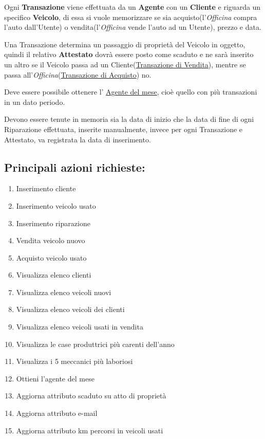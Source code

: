 \documentclass[a4paper,12pt]{report}
\begin{document}
Ogni \textbf{Transazione} viene effettuata da un \textbf{Agente} con un \textbf{Cliente} e riguarda un specifico \textbf{Veicolo},
%
di essa si vuole memorizzare se sia acquisto(l'\textit{Officina} compra l'auto dall'Utente) o vendita(l'\textit{Officina} 
% 
vende l'auto ad un Utente), prezzo e data. 

\noindent
Una Transazione determina un passaggio di proprietà del Veicolo in oggetto, quindi il relativo \textbf{Attestato} 
%
dovrà essere posto come scaduto e ne sarà inserito un altro se il Veicolo passa ad un Cliente(\underline{Transazione di Vendita}),
%
mentre se passa all'\textit{Officina}(\underline{Transazione di Acquisto}) no.

Deve essere possibile ottenere l' \underline{Agente del mese}, cioè quello con più transazioni in un dato periodo. 

Devono essere tenute in memoria sia la data di inizio che la data di fine di ogni Riparazione effettuata, inserite manualmente,
%
invece per ogni Transazione e Attestato, va registrata la data di inserimento.

\subsection*{Principali azioni richieste:}
\begin{enumerate}
	\item Inserimento cliente
	\item Inserimento veicolo usato
	\item Inserimento riparazione
	\item Vendita veicolo nuovo
	\item Acquisto veicolo usato 
	\item Visualizza elenco clienti
	\item Visualizza elenco veicoli nuovi
	\item Visualizza elenco veicoli dei clienti
	\item Visualizza elenco veicoli usati in vendita 
	\item Visualizza le case produttrici più carenti dell'anno 
	\item Visualizza i 5 meccanici più laboriosi
	\item Ottieni l'agente del mese
	\item Aggiorna attributo scaduto su atto di proprietà
	\item Aggiorna attributo e-mail
	\item Aggiorna attributo km percorsi in veicoli usati 
\end{enumerate}
\end{document}
